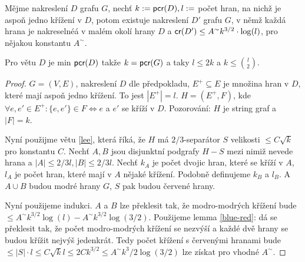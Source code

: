 \begin{tvrz}
	Mějme nakreslení $D$ grafu $G$, nechť $k := \textsf{pcr}(D), l :=$ počet hran, na nichž je aspoň jedno křížení v $D$, potom existuje nakreslení $D'$ grafu $G$, v němž každá hrana je nakreselnéá v malém okolí hrany $D$ a $\textsf{cr}(D') \leq A^\sim k^{3/2} \cdot \log(l)$, pro nějakou konstantu $A^\sim$.
\end{tvrz}

Pro větu $D$ je min $\textsf{pcr}(D)$ takže $k = \textsf{pcr}(G)$ a taky $l \leq 2k$ a $k \leq \binom{l}{2}$.

\begin{proof}
	$G = (V,E)$, nakreslení $D$ dle předpokladu, $E^+ \subseteq E$ je množina hran v $D$, které mají aspoň jedno křížení. To jest $|E^+| = l$. $H = (E^+, F)$, kde $\forall e, e' \in E^+: \{e,e'\} \in F \iff e$ a $e'$ se kříží v $D$. Pozorování: $H$ je string graf a $|F| = k$.
	
	Nyní použijme větu \ref{lee}, která říká, že $H$ má $2/3$-separátor $S$ velikosti $\leq C \sqrt{k}$ pro konstantu $C$. Nechť $A, B$ jsou disjunktní podgrafy $H - S$ mezi nimiž nevede hrana a $|A| \leq 2/3 l, |B| \leq 2/3 l$. Nechť $k_A$ je počet dvojic hran, které se kříží v $A$, $l_A$ je počet hran, které mají v $A$ nějaké křížení. Podobně definujeme $k_B$ a $l_B$. A $A \cup B$ budou modré hrany $G$, $S$ pak budou červené hrany.
	
	Nyní použijeme indukci. $A$ a $B$ lze překlesit tak, že modro-modrých křížení bude $\leq A^\sim k^{3/2} \log(l) - A^\sim k^{3/2} \log(3/2)$. Použijeme lemma \ref{blue-red}: dá se překlesit tak, že počet modro-modrých křížení se nezvýší a každé dvě hrany se budou křížit nejvýš jedenkrát. Tedy počet křížení s červenými hranami bude $\leq |S| \cdot l \leq C \sqrt{k} l \leq 2 C k^{3/2} \leq A^\sim k^3/2 \log(3/2)$ lze získat pro vhodné $A^\sim$.
\end{proof}

\newcommand{\conge}{\textsf{cong}}
\newcommand{\spars}{\textsf{spars}}

